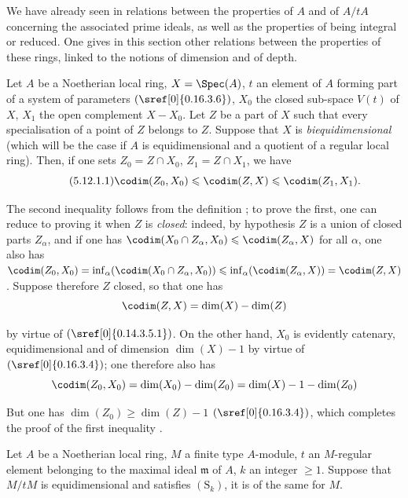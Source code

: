 
We have already seen in  relations between the properties of $A$ and of $A/tA$ concerning the associated prime ideals, as well as the properties of being integral or reduced.
One gives in this section other relations between the properties of these rings, linked to the notions of dimension and of depth.

\begin{proposition}[5.12.1]
\label{IV.5.12.1}
Let $A$ be a Noetherian local ring, $X=\Spec(A)$, $t$ an element of $A$ forming part of a system of parameters $(\sref[0]{0.16.3.6})$, $X_0$ the closed sub-space $V(t)$ of $X$, $X_1$ the open complement $X-X_0$.
Let $Z$ be a part of $X$ such that every specialisation of a point of $Z$ belongs to $Z$.
Suppose that $X$ is \emph{biequidimensional} (which will be the case if $A$ is equidimensional and a quotient of a regular local ring).
Then, if one sets $Z_0=Z\cap X_0$, $Z_1=Z\cap X_1$, we have
\begin{equation}
\tag{5.12.1.1}
\label{IV.5.12.1.1}
  \codim(Z_0,X_0)\leqslant\codim(Z,X)\leqslant\codim(Z_1,X_1).
\end{equation}
\end{proposition}

The second inequality follows from the definition ; to prove the first, one can reduce to proving it when $Z$ is \emph{closed}: indeed, by hypothesis $Z$ is a union of closed parts $Z_\alpha$, and if one has $\codim(X_0\cap Z_\alpha,X_0)\leqslant\codim(Z_\alpha,X)$ for all $\alpha$, one also has $\codim(Z_0,X_0)=\inf_\alpha(\codim(X_0\cap Z_\alpha,X_0))\leqslant\inf_\alpha(\codim(Z_\alpha,X))=\codim(Z,X)$.
Suppose therefore $Z$ closed, so that one has
\[
  \codim(Z,X)=\dim(X)-\dim(Z)
\]


by virtue of $(\sref[0]{0.14.3.5.1})$.
On the other hand, $X_0$ is evidently catenary, equidimensional and of dimension $\dim(X)-1$ by virtue of $(\sref[0]{0.16.3.4})$; one therefore also has
\[
  \codim(Z_0,X_0)=\dim(X_0)-\dim(Z_0)=\dim(X)-1-\dim(Z_0)
\]

But one has $\dim(Z_0)\geqslant\dim(Z)-1$ $(\sref[0]{0.16.3.4})$, which completes the proof of the first inequality .

\begin{proposition}[5.12.2]
\label{IV.5.12.2}
Let $A$ be a Noetherian local ring, $M$ a finite type $A$-module, $t$ an $M$-regular element belonging to the maximal ideal $\mathfrak{m}$ of $A$, $k$ an integer $\geqslant 1$.
Suppose that $M/tM$ is equidimensional and satisfies $(\mathrm{S}_k)$, it is of the same for $M$.
\end{proposition}

